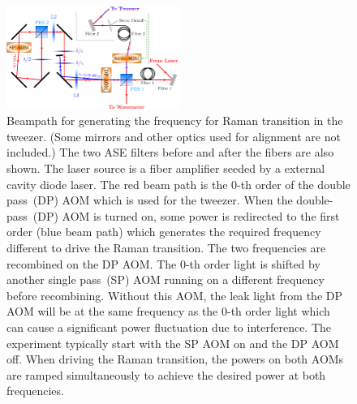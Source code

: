 \documentclass[aps,prl,twocolumn,10pt,superscriptaddress]{revtex4-1}
\begin{document}
\begin{figure}
  \includegraphics[width=0.5\textwidth]{imgs/raman_spectroscopy_raman_beampath.pdf}
  \caption{
    Beampath for generating the frequency for Raman transition in the tweezer.
    (Some mirrors and other optics used for alignment are not included.)
    The two ASE filters before and after the fibers are also shown. The laser source is a fiber amplifier seeded by a external cavity diode laser.
    The red beam path is the $0$-th order of the double pass~(DP) AOM
    which is used for the tweezer.
    When the double-pass~(DP) AOM is turned on, some power is redirected to the first order
    (blue beam path) which generates the required frequency different to drive
    the Raman transition. The two frequencies are recombined on the DP AOM.
    The $0$-th order light is shifted by another single pass~(SP) AOM
    running on a different frequency before recombining.
    Without this AOM, the leak light from the DP AOM will be at the same frequency
    as the $0$-th order light which can cause a significant power fluctuation
    due to interference.
    The experiment typically start with the SP AOM on and the DP AOM off.
    When driving the Raman transition, the powers on both AOMs are ramped simultaneously
    to achieve the desired power at both frequencies.
    \label{f-beampath}
  }
\end{figure}
\end{document}
